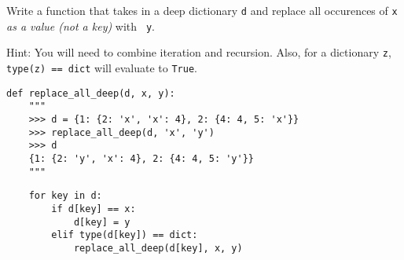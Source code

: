 \question Write a function that takes in a deep dictionary {\tt d} and
replace all occurences of {\tt x} {\it as a value (not a key)} with {\tt
y}.

Hint: You will need to combine iteration and recursion. Also, for a
dictionary \texttt{z}, \texttt{type(z) == dict} will evaluate to
\texttt{True}.
\begin{lstlisting}
def replace_all_deep(d, x, y):
    """
    >>> d = {1: {2: 'x', 'x': 4}, 2: {4: 4, 5: 'x'}}
    >>> replace_all_deep(d, 'x', 'y')
    >>> d
    {1: {2: 'y', 'x': 4}, 2: {4: 4, 5: 'y'}}
    """
\end{lstlisting}
\begin{solution}[2in]
\begin{lstlisting}
    for key in d:
        if d[key] == x:
            d[key] = y
        elif type(d[key]) == dict:
            replace_all_deep(d[key], x, y)
\end{lstlisting}
\end{solution}
